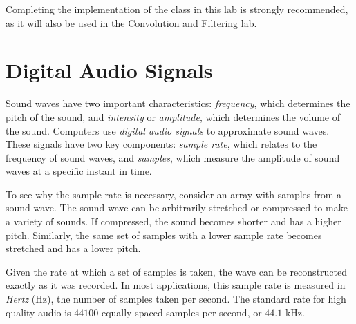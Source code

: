 \labdependencies{}

\begin{warn}
    Completing the implementation of the  class in this lab is strongly recommended, as it will also be used in the Convolution and Filtering lab.
\end{warn}

\section*{Digital Audio Signals} %

Sound waves have two important characteristics: \emph{frequency}, which determines the pitch of the sound, and \emph{intensity} or \emph{amplitude}, which determines the volume of the sound.
Computers use \emph{digital audio signals} to approximate sound waves.
These signals have two key components: \emph{sample rate}, which relates to the frequency of sound waves, and \emph{samples}, which measure the amplitude of sound waves at a specific instant in time.

To see why the sample rate is necessary, consider an array with samples from a sound wave.
The sound wave can be arbitrarily stretched or compressed to make a variety of sounds.
If compressed, the sound becomes shorter and has a higher pitch.
Similarly, the same set of samples with a lower sample rate becomes stretched and has a lower pitch.

Given the rate at which a set of samples is taken, the wave can be reconstructed exactly as it was recorded.
In most applications, this sample rate is measured in \emph{Hertz} (Hz), the number of samples taken per second.
The standard rate for high quality audio is $44100$ equally spaced samples per second, or $44.1$ kHz.

